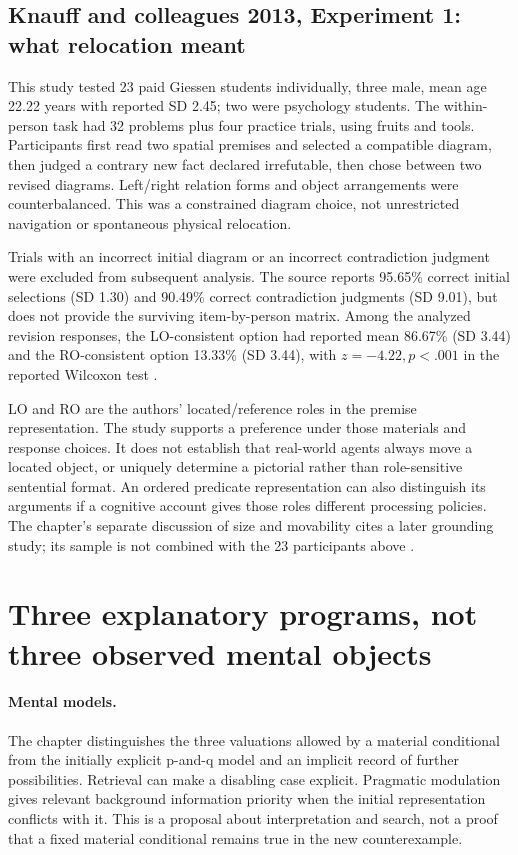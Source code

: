\subsection{Knauff and colleagues 2013, Experiment 1: what relocation meant}

This study tested 23 paid Giessen students individually, three male,
mean age 22.22 years with reported SD 2.45; two were psychology students.
The within-person task had 32 problems plus four practice trials, using
fruits and tools. Participants first read two spatial premises and selected
a compatible diagram, then judged a contrary new fact declared irrefutable,
then chose between two revised diagrams. Left/right relation forms and
object arrangements were counterbalanced. This was a constrained diagram
choice, not unrestricted navigation or spontaneous physical relocation.

Trials with an incorrect initial diagram or an incorrect contradiction
judgment were excluded from subsequent analysis. The source reports
95.65\% correct initial selections (SD 1.30) and 90.49\% correct contradiction
judgments (SD 9.01), but does not provide the surviving item-by-person
matrix. Among the analyzed revision responses, the LO-consistent option
had reported mean 86.67\% (SD 3.44) and the RO-consistent option 13.33\%
(SD 3.44), with \(z=-4.22,p<.001\) in the reported Wilcoxon test
\cite[Experiment~1]{KnauffEtAl2013SpatialRevision}.

LO and RO are the authors' located/reference roles in the premise
representation. The study supports a preference under those materials
and response choices. It does not establish that real-world agents always
move a located object, or uniquely determine a pictorial rather than
role-sensitive sentential format. An ordered predicate representation can
also distinguish its arguments if a cognitive account gives those roles
different processing policies. The chapter's separate discussion of size
and movability cites a later grounding study; its sample is not combined
with the 23 participants above
\cite[\S3.2]{GazzoCastanedaKnauff2021Defeasible}.

\section{Three explanatory programs, not three observed mental objects}
\label{sec:p19-r54-theories}

\paragraph{Mental models.}
The chapter distinguishes the three valuations allowed by a material
conditional from the initially explicit p-and-q model and an implicit
record of further possibilities. Retrieval can make a disabling case
explicit. Pragmatic modulation gives relevant background information
priority when the initial representation conflicts with it. This is a
proposal about interpretation and search, not a proof that a fixed
material conditional remains true in the new counterexample.

